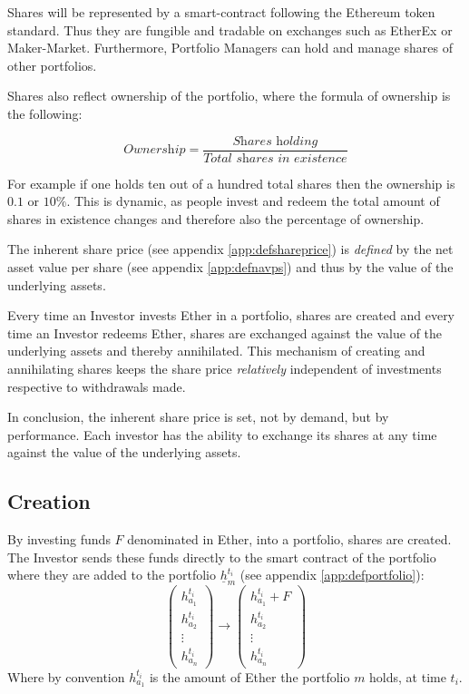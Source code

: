 \documentclass[9pt,oneside]{amsart}
\theoremstyle{plain}
\begin{document}
\begin{multicols}{2}
Shares will be represented by a smart-contract following the Ethereum token standard\cite{tokenstandard}. Thus they are fungible and tradable on exchanges such as EtherEx\cite{etherex} or Maker-Market\cite{maker-market}. Furthermore, Portfolio Managers can hold and manage shares of other portfolios.

Shares also reflect ownership of the portfolio, where the formula of ownership is the following:

\begin{equation}
	\textit{Ownership} = \frac{\textit{Shares holding}}{\textit{Total shares in existence}}
\end{equation}

For example if one holds ten out of a hundred total shares then the ownership is $0.1$ or $10\%$. This is dynamic, as people invest and redeem the total amount of shares in existence changes and therefore also the percentage of ownership. 

The inherent share price (see appendix \ref{app:defshareprice}) is \textit{defined} by the net asset value per share (see appendix \ref{app:defnavps}) and thus by the value of the underlying assets.

Every time an Investor invests Ether in a portfolio, shares are created and every time an Investor redeems Ether, shares are exchanged against the value of the underlying assets and thereby annihilated. This mechanism of creating and annihilating shares keeps the share price \textit{relatively} independent of investments respective to withdrawals made.

In conclusion, the inherent share price is set, not by demand, but by performance. Each investor has the ability to exchange its shares at any time against the value of the underlying assets. 

\subsection{Creation}\label{sub:creation}

By investing funds $F$ denominated in Ether, into a portfolio, shares are created. The Investor sends these funds directly to the smart contract of the portfolio where they are added to the portfolio $\underline{h}_m^{t_i}$ (see appendix \ref{app:defportfolio}):
\begin{equation*}
	\begin{pmatrix}
		h_{a_{1}}^{t_i}\\
		h_{a_{2}}^{t_i}\\
		\vdots \\
		h_{a_{n}}^{t_i}
	\end{pmatrix}
	\rightarrow
	\begin{pmatrix}
		h_{a_{1}}^{t_i} + F\\
		h_{a_{2}}^{t_i}\\
		\vdots \\
		h_{a_{n}}^{t_i}
	\end{pmatrix}
\end{equation*}
Where by convention $h_{a_{1}}^{t_i}$ is the amount of Ether the portfolio $m$ holds, at time $t_i$.


\end{multicols}
\end{document}
